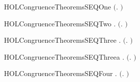 \newcommand{\HOLCongruenceTheoremsPCCXXisXXcoarsest}{\UseVerbatim{HOLCongruenceTheoremsPCCXXisXXcoarsest}}
\begin{SaveVerbatim}{HOLCongruenceTheoremsSEQOne}
\HOLTokenTurnstile{}  \ensuremath{(}\HOLTokenLambda{}. \ensuremath{)}
\end{SaveVerbatim}
\newcommand{\HOLCongruenceTheoremsSEQOne}{\UseVerbatim{HOLCongruenceTheoremsSEQOne}}
\begin{SaveVerbatim}{HOLCongruenceTheoremsSEQTwo}
\HOLTokenTurnstile{} \HOLSymConst{\HOLTokenForall{}}.  \ensuremath{(}\HOLTokenLambda{}. \ensuremath{)}
\end{SaveVerbatim}
\newcommand{\HOLCongruenceTheoremsSEQTwo}{\UseVerbatim{HOLCongruenceTheoremsSEQTwo}}
\begin{SaveVerbatim}{HOLCongruenceTheoremsSEQThree}
\HOLTokenTurnstile{} \HOLSymConst{\HOLTokenForall{}} .   \HOLSymConst{\HOLTokenImp{}}  \ensuremath{(}\HOLTokenLambda{}. \HOLSymConst{\ensuremath{\ldotp}} \ensuremath{)}
\end{SaveVerbatim}
\newcommand{\HOLCongruenceTheoremsSEQThree}{\UseVerbatim{HOLCongruenceTheoremsSEQThree}}
\begin{SaveVerbatim}{HOLCongruenceTheoremsSEQThreea}
\HOLTokenTurnstile{} \HOLSymConst{\HOLTokenForall{}}.  \ensuremath{(}\HOLTokenLambda{}. \HOLSymConst{\ensuremath{\ldotp}}\ensuremath{)}
\end{SaveVerbatim}
\newcommand{\HOLCongruenceTheoremsSEQThreea}{\UseVerbatim{HOLCongruenceTheoremsSEQThreea}}
\begin{SaveVerbatim}{HOLCongruenceTheoremsSEQFour}
\HOLTokenTurnstile{} \HOLSymConst{\HOLTokenForall{}} .   \HOLSymConst{\HOLTokenConj{}}   \HOLSymConst{\HOLTokenImp{}}  \ensuremath{(}\HOLTokenLambda{}.   \HOLSymConst{\ensuremath{+}}  \ensuremath{)}
\end{SaveVerbatim}
\newcommand{\HOLCongruenceTheoremsSEQFour}{\UseVerbatim{HOLCongruenceTheoremsSEQFour}}
